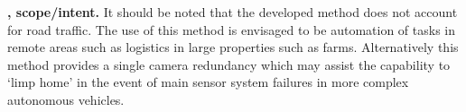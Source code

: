 \documentclass[]{aiaa-tc}%
\begin{document}
\textbf{, scope/intent. }It should be noted that the developed method does not account for road traffic. The use of this method is envisaged to be automation of tasks in remote areas such as logistics in large properties such as farms. Alternatively this method provides a single camera redundancy which may assist the capability to `limp home' in the event of main sensor system failures in more complex autonomous vehicles.

%
%
%
\end{document}
